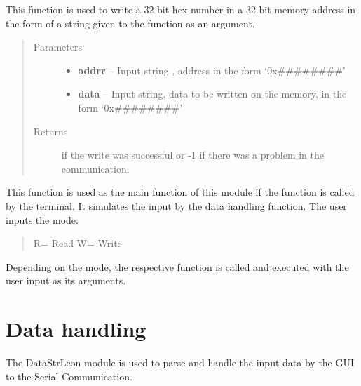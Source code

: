 \documentclass[letterpaper,10pt,english]{sphinxmanual}
\begin{document}

\begin{fulllineitems}
\label{Code:ahbSeri.ahbwrite}
This function is used to write a 32-bit hex number in a 32-bit memory address in the form of a 
string given to the function as an argument.
\begin{quote}\begin{description}
\item[{Parameters}] \leavevmode\begin{itemize}
\item {} 
\textbf{addrr} -- Input string , address in the form `0x\#\#\#\#\#\#\#\#'

\item {} 
\textbf{data} -- Input string, data to be written on the memory, in the form `0x\#\#\#\#\#\#\#\#'

\end{itemize}

\item[{Returns}]  if the write was successful or -1 if there was a problem in the communication.

\end{description}\end{quote}

\end{fulllineitems}


\begin{fulllineitems}
\label{Code:ahbSeri.userinput}
This function is used as the main function of this module if the function is called by the terminal.
It simulates the input by the data handling function. 
The user inputs the mode:
\begin{quote}

R= Read
W= Write
\end{quote}

Depending on the mode, the respective function is called and executed with the user input as its arguments.

\end{fulllineitems}



\section{Data handling}
\label{Code:data-handling}\label{Code:module-DataStrLeon}
The DataStrLeon module is used to parse and handle the input data by the GUI to the Serial Communication.
\end{document}
